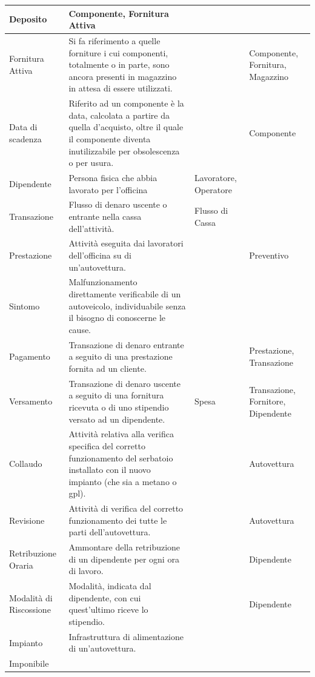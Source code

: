\begin{longtable}{| p{2.5cm} | p{4.5cm} | p{2cm} | p{2.5cm} |}
			Deposito &
			Componente, Fornitura Attiva
			\\ \hline
			Fornitura Attiva &
			Si fa riferimento a quelle forniture i cui componenti, totalmente o in parte, sono ancora presenti in magazzino in attesa di essere utilizzati. &
			&
			Componente, Fornitura, Magazzino
			\\ \hline
			Data di scadenza &
			Riferito ad un componente è la data, calcolata a partire da quella d'acquisto, oltre il quale il componente diventa inutilizzabile per obsolescenza o per usura. &
			&
			Componente
			\\ \hline
			Dipendente & 
			Persona fisica che abbia lavorato per l’officina &
			Lavoratore, Operatore &
			\\ \hline
			Transazione &
			Flusso di denaro uscente o entrante nella cassa dell’attività. &
			Flusso di Cassa &
			\\ \hline
			Prestazione &
			Attività eseguita dai lavoratori dell’officina su di un’autovettura. & &
			Preventivo
			\\ \hline
			Sintomo &
			Malfunzionamento direttamente verificabile di un autoveicolo, individuabile senza il bisogno di conoscerne le cause. &
			& \\ \hline
			Pagamento &
			Transazione di denaro entrante a seguito di una prestazione fornita ad un cliente. &&
			Prestazione, Transazione
			\\ \hline
			Versamento &
			Transazione di denaro uscente a seguito di una fornitura ricevuta o di uno stipendio versato ad un dipendente. & 
			Spesa & 
			Transazione, Fornitore, Dipendente 
			\\ \hline
			Collaudo &
			Attività relativa alla verifica specifica del corretto funzionamento del serbatoio installato con il nuovo impianto (che sia a metano o gpl). &&
			Autovettura
			\\ \hline
			Revisione & 
			Attività di verifica del corretto funzionamento dei tutte le parti dell’autovettura. &&
			Autovettura
			\\ \hline
			Retribuzione Oraria & 
			Ammontare della retribuzione di un dipendente per ogni ora di lavoro. && 
			Dipendente
			\\ \hline
			Modalità di Riscossione &
			Modalità, indicata dal dipendente, con cui quest’ultimo riceve lo stipendio. &&
			Dipendente 
			\\ \hline
			Impianto & 
			Infrastruttura di alimentazione di un’autovettura.
			&&\\ \hline
			Imponibile &

\end{longtable}
